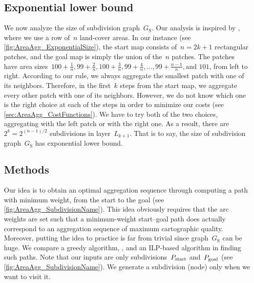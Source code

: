 \documentclass[acmsmall,natbib=false]{acmart}
\begin{document}
\subsection{Exponential lower bound}
\label{sec:AreaAgg_Exponential}
We now analyze the size of subdivision graph~$G_\mathrm{S}$.
Our analysis is inspired by \textcite{Keane1975Size},
where we use a row of~$n$ land-cover areas.
In our instance
(see \fig\ref{fig:AreaAgg_ExponentialSize}), 
the start map consists of~$n=2k+1$ rectangular patches,
and the goal map is simply the union of the~$n$ patches.
The patches have area 
sizes~$
100 + \frac{1}{n}, 99+ \frac{2}{n}, 
100 + \frac{3}{n}, 99+ \frac{4}{n}, \ldots, 
99 + \frac{n-1}{n}, \text{and~} 101 
$, 
from left to right.
According to our rule, we always 
aggregate the smallest patch with one of its neighbors.
Therefore, in the first~$k$ steps from the start map,
we aggregate every other patch with one of its neighbors.
However, we do not know which one is the right choice
at each of the steps
in order to minimize our costs (see \sect\ref{sec:AreaAgg_CostFunctions}).
We have to try both of the two choices,
aggregating with the left patch or with the right one.
As a result, there are~$2^k = 2^{(n-1)/2}$ subdivisions 
in layer~$L_{k+1}$.
That is to say, the size of subdivision graph~$G_\mathrm{S}$
has exponential lower bound.


\subsection{Methods}
\label{sec:AreaAgg_Methods}

Our idea is to obtain an optimal aggregation sequence through 
computing a path with minimum weight, from the start to the goal 
(see \fig\ref{fig:AreaAgg_SubdivisionName}).
This idea obviously requires that the arc weights are 
set such that a minimum-weight start--goal
path does actually correspond to an aggregation sequence of 
maximum cartographic quality.  
Moreover, putting the idea to practice is far from trivial 
since graph~$G_\mathrm{S}$ can be huge.
We compare a greedy algorithm, \Astar, and an ILP-based algorithm
in finding such paths.
Note that our inputs are only
subdivisions~$P_\mathrm{start}$ and~$P_\mathrm{goal}$
(see \fig\ref{fig:AreaAgg_SubdivisionName}).
We generate a subdivision (node) only when we want to visit it.
\end{document}
